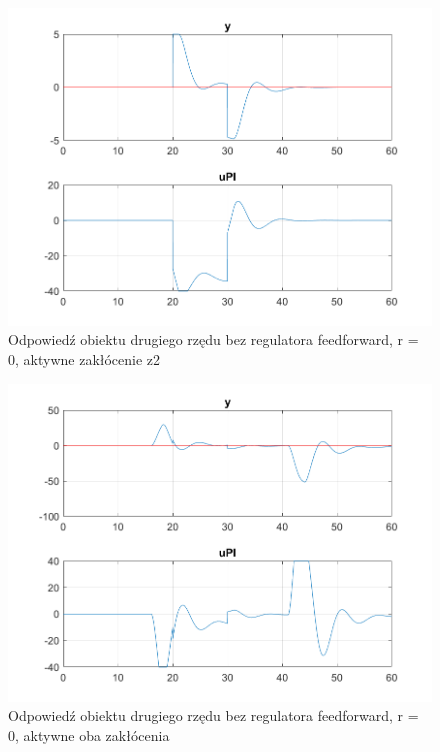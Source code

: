 \begin{figure}[h!]
	\centering
	\includegraphics[scale = 0.8]{fig/bezFeedforward/fig1_2_0_z2.png}
	\caption		
	{Odpowiedź obiektu drugiego rzędu bez regulatora feedforward, r = 0, aktywne zakłócenie z2}
	\label{wykres_6}
\end{figure}

\begin{figure}[h!]
	\centering
	\includegraphics[scale = 0.8]{fig/bezFeedforward/fig1_2_0_z1z2.png}
	\caption		
	{Odpowiedź obiektu drugiego rzędu bez regulatora feedforward, r = 0, aktywne oba zakłócenia}
	\label{wykres_7}
\end{figure}